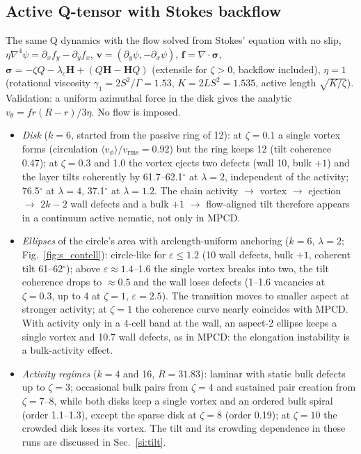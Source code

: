 \documentclass[aps,prl,onecolumn,superscriptaddress,amsmath,amssymb,nofootinbib]{revtex4-2}
\begin{document}
\subsection{Active Q-tensor with Stokes backflow}
The same Q dynamics with the flow solved from Stokes' equation with no slip, $\eta\nabla^4\psi=\partial_xf_y-\partial_yf_x$, $\mathbf v=(\partial_y\psi,-\partial_x\psi)$,
$\mathbf f=\nabla\!\cdot\boldsymbol\sigma$, $\boldsymbol\sigma=-\zeta Q-\lambda_c\mathbf H+(Q\mathbf H-\mathbf HQ)$ (extensile for $\zeta>0$, backflow included), $\eta=1$
(rotational viscosity $\gamma_1=2S^2/\Gamma=1.53$, $K=2LS^2=1.535$, active length $\sqrt{K/\zeta}$). Validation: a uniform azimuthal force in the disk gives the analytic
$v_\theta=fr(R-r)/3\eta$. No flow is imposed.
\begin{itemize}
\item \emph{Disk} ($k=6$, started from the passive ring of 12): at $\zeta=0.1$ a single vortex forms (circulation $\langle v_\phi\rangle/v_\mathrm{rms}=0.92$) but the ring keeps 12
(tilt coherence 0.47); at $\zeta=0.3$ and 1.0 the vortex ejects two defects (wall 10, bulk $+1$) and the layer tilts coherently by 61.7--62.1$^\circ$ at $\lambda=2$, independent
of the activity; 76.5$^\circ$ at $\lambda=4$, 37.1$^\circ$ at $\lambda=1.2$. The chain activity $\to$ vortex $\to$ ejection $\to$ $2k-2$ wall defects and a bulk $+1$ $\to$
flow-aligned tilt therefore appears in a continuum active nematic, not only in MPCD.
\item \emph{Ellipses} of the circle's area with arclength-uniform anchoring ($k=6$, $\lambda=2$; Fig.~\ref{fig:s_contell}): circle-like for $\varepsilon\leq1.2$ (10 wall defects,
bulk $+1$, coherent tilt 61--62$^\circ$); above $\varepsilon\approx1.4$--1.6 the single vortex breaks into two, the tilt coherence drops to $\approx0.5$ and the wall loses defects
(1--1.6 vacancies at $\zeta=0.3$, up to 4 at $\zeta=1$, $\varepsilon=2.5$). The transition moves to smaller aspect at stronger activity; at $\zeta=1$ the coherence curve nearly
coincides with MPCD. With activity only in a 4-cell band at the wall, an aspect-2 ellipse keeps a single vortex and 10.7 wall defects, as in MPCD: the elongation
instability is a bulk-activity effect.
\item \emph{Activity regimes} ($k=4$ and 16, $R=31.83$): laminar with static bulk defects up to $\zeta=3$; occasional bulk pairs from $\zeta=4$ and sustained pair creation from
$\zeta=7$--8, while both disks keep a single vortex and an ordered bulk spiral (order 1.1--1.3), except the sparse disk at $\zeta=8$ (order 0.19); at $\zeta=10$ the crowded
disk loses its vortex. The tilt and its crowding dependence in these
runs are discussed in Sec.~\ref{si:tilt}.
\end{itemize}
\end{document}
